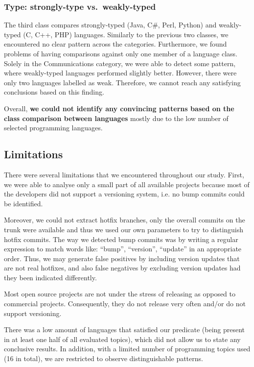 \documentclass{sig-alternate}
\begin{document}
\subsubsection*{Type: strongly-type vs.\ weakly-typed}
The third class compares strongly-typed (Java, C\#, Perl, Python) and weakly-typed (C, C++, PHP) languages. Similarly to the previous two classes, we encountered no clear pattern across the categories. Furthermore, we found problems of having comparisons against only one member of a language class. Solely in the Communications category, we were able to detect some pattern, where weakly-typed languages performed slightly better. However, there were only two languages labelled as weak. Therefore, we cannot reach any satisfying conclusions based on this finding.

Overall, \textbf{we could not identify any convincing patterns based on the class comparison between languages} mostly due to the low number of selected programming languages.

\subsection{Limitations}
There were several limitations that we encountered throughout our study. First, we were able to analyse only a small part of all available projects because most of the developers did not support a versioning system, i.e. no bump commits could be identified.

Moreover, we could not extract hotfix branches, only the overall commits on the trunk were available and thus we used our own parameters to try to distinguish hotfix commits. The way we detected bump commits was by writing a regular expression to match words like:  ``bump'', ``version'', ``update'' in an appropriate order. Thus, we may generate false positives by including version updates that are not real hotfixes, and also false negatives by excluding version updates had they been indicated differently.

Most open source projects are not under the stress of releasing as opposed to commercial projects. Consequently, they do not release very often and/or do not support versioning.

There was a low amount of languages that satisfied our predicate (being present in at least one half of all evaluated topics), which did not allow us to state any conclusive results. In addition, with a limited number of programming topics used (16 in total), we are restricted to observe distinguishable patterns.
\end{document}

